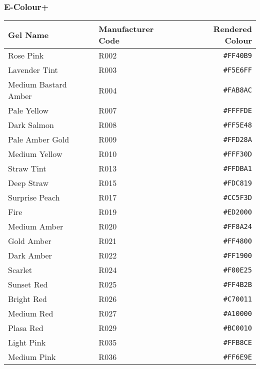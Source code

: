 \documentclass[a4paper]{article}
\begin{document}
\subsubsection{E-Colour+}
\begin{longtable}{|l|l|r|}
\hline
Gel Name & Manufacturer Code & Rendered Colour \\ \hline
Rose Pink & R002 & \texttt{\#FF40B9} \cellcolor[HTML]{FF40B9} \\
Lavender Tint & R003 & \texttt{\#F5E6FF} \cellcolor[HTML]{F5E6FF} \\
Medium Bastard Amber & R004 & \texttt{\#FAB8AC} \cellcolor[HTML]{FAB8AC} \\
Pale Yellow & R007 & \texttt{\#FFFFDE} \cellcolor[HTML]{FFFFDE} \\
Dark Salmon & R008 & \texttt{\#FF5E48} \cellcolor[HTML]{FF5E48} \\
Pale Amber Gold & R009 & \texttt{\#FFD28A} \cellcolor[HTML]{FFD28A} \\
Medium Yellow & R010 & \texttt{\#FFF30D} \cellcolor[HTML]{FFF30D} \\
Straw Tint & R013 & \texttt{\#FFDBA1} \cellcolor[HTML]{FFDBA1} \\
Deep Straw & R015 & \texttt{\#FDC819} \cellcolor[HTML]{FDC819} \\
Surprise Peach & R017 & \texttt{\#CC5F3D} \cellcolor[HTML]{CC5F3D} \\
Fire & R019 & \texttt{\#ED2000} \cellcolor[HTML]{ED2000} \\
Medium Amber & R020 & \texttt{\#FF8A24} \cellcolor[HTML]{FF8A24} \\
Gold Amber & R021 & \texttt{\#FF4800} \cellcolor[HTML]{FF4800} \\
Dark Amber & R022 & \texttt{\#FF1900} \cellcolor[HTML]{FF1900} \\
Scarlet & R024 & \texttt{\#F00E25} \cellcolor[HTML]{F00E25} \\
Sunset Red & R025 & \texttt{\#FF4B2B} \cellcolor[HTML]{FF4B2B} \\
Bright Red & R026 & \texttt{\#C70011} \cellcolor[HTML]{C70011} \\
Medium Red & R027 & \texttt{\#A10000} \cellcolor[HTML]{A10000} \\
Plasa Red & R029 & \texttt{\#BC0010} \cellcolor[HTML]{BC0010} \\
Light Pink & R035 & \texttt{\#FFB8CE} \cellcolor[HTML]{FFB8CE} \\
Medium Pink & R036 & \texttt{\#FF6E9E} \cellcolor[HTML]{FF6E9E} \\

\end{longtable}
\end{document}
